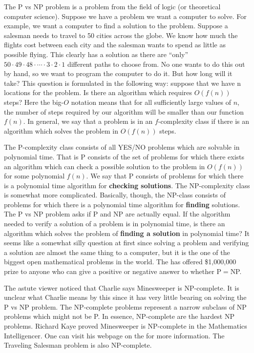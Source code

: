 The P vs NP problem is a problem from the field of logic (or theoretical computer science).  Suppose we have a problem we want a computer to solve. For example, we want a computer to find a solution to the  problem. Suppose a salesman needs to travel to 50 cities across the globe. We know how much the flights cost between each city and the salesman wants to spend as little as possible flying. This clearly has a solution as there are ``only'' $50 \cdot 49 \cdot 48 \cdot \cdots \cdot 3 \cdot 2 \cdot 1$ different paths to choose from. No one wants to do this out by hand, so we want to program the computer to do it. But how long will it take? This question is formulated in the following way: suppose that we have n locations for the problem.  Is there an algorithm which requires $O(f(n))$ steps? Here the big-$O$ notation means that for all sufficiently large values of $n$, the number of steps required by our algorithm will be smaller than our function $f(n)$. In general, we say that a problem is in an $f$-complexity class if there is an algorithm which solves the problem in $O(f(n))$ steps.


The P-complexity class consists of all YES/NO problems which are solvable in polynomial time. That is P consists of the set of problems for which there exists an algorithm which can check a possible solution to the problem in $O(f(n))$ for some polynomial $f(n)$. We say that P consists of problems for which there is a polynomial time algorithm for \textbf{checking solutions}. The NP-complexity class is somewhat more complicated. Basically, though, the NP-class consists of problems for which there is a polynomial time algorithm for \textbf{finding} solutions. The P vs NP problem asks if P and NP are actually equal. If the algorithm needed to verify a solution of a problem is in polynomial time, is there an algorithm which solves the problem of \textbf{finding a solution} in polynomial time? It seems like a somewhat silly question at first since solving a problem and verifying a solution are almost the same thing to a computer, but it is the one of the biggest open mathematical problems in the world.  The  has offered \$1,000,000 prize to anyone who can give a positive or negative answer to whether P$=$NP. 


The astute viewer noticed that Charlie says Minesweeper is NP-complete. It is unclear what Charlie means by this since it has very little bearing on solving the P vs NP problem. The NP-complete problems represent a narrow subclass of NP problems which might not be P. In essence, NP-complete are the hardest NP problems. Richard Kaye proved Minesweeper is NP-complete in the Mathematics Intelligencer. One can visit his webpage on the  for more information. The Traveling Salesman problem is also NP-complete.



